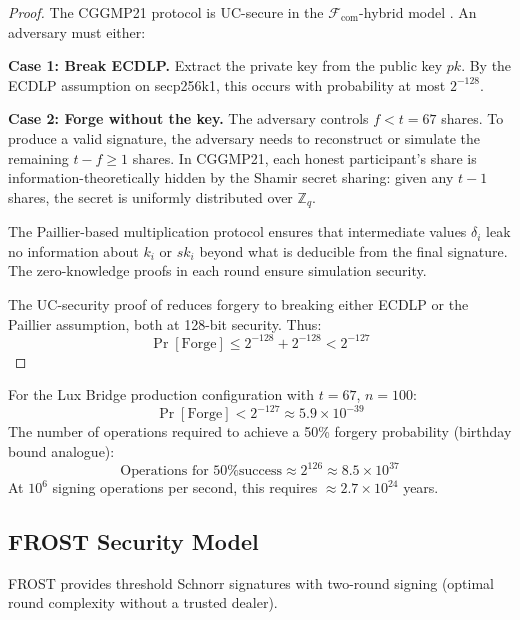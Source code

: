 \begin{proof}
The CGGMP21 protocol is UC-secure in the $\mathcal{F}_{\text{com}}$-hybrid model \cite{cgg21}. An adversary must either:

\textbf{Case 1: Break ECDLP.} Extract the private key from the public key $pk$. By the ECDLP assumption on secp256k1, this occurs with probability at most $2^{-128}$.

\textbf{Case 2: Forge without the key.} The adversary controls $f < t = 67$ shares. To produce a valid signature, the adversary needs to reconstruct or simulate the remaining $t - f \geq 1$ shares. In CGGMP21, each honest participant's share is information-theoretically hidden by the Shamir secret sharing: given any $t - 1$ shares, the secret is uniformly distributed over $\mathbb{Z}_q$.

The Paillier-based multiplication protocol ensures that intermediate values $\delta_i$ leak no information about $k_i$ or $sk_i$ beyond what is deducible from the final signature. The zero-knowledge proofs in each round ensure simulation security.

The UC-security proof of \cite{cgg21} reduces forgery to breaking either ECDLP or the Paillier assumption, both at 128-bit security. Thus:
\begin{equation}
\Pr[\text{Forge}] \leq 2^{-128} + 2^{-128} < 2^{-127}
\end{equation}
\end{proof}

\begin{corollary}[Operational Security at $n = 100$]
For the Lux Bridge production configuration with $t = 67$, $n = 100$:
\begin{equation}
\Pr[\text{Forge}] < 2^{-127} \approx 5.9 \times 10^{-39}
\end{equation}
The number of operations required to achieve a 50\% forgery probability (birthday bound analogue):
\begin{equation}
\text{Operations for 50\% success} \approx 2^{126} \approx 8.5 \times 10^{37}
\end{equation}
At $10^6$ signing operations per second, this requires $\approx 2.7 \times 10^{24}$ years.
\end{corollary}

\subsection{FROST Security Model}

FROST \cite{frost} provides threshold Schnorr signatures with two-round signing (optimal round complexity without a trusted dealer).

